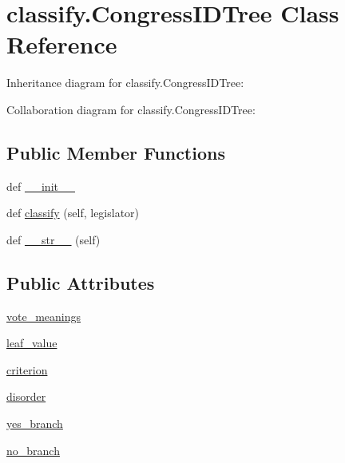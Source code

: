 \hypertarget{classclassify_1_1_congress_i_d_tree}{}\section{classify.\+Congress\+I\+D\+Tree Class Reference}
\label{classclassify_1_1_congress_i_d_tree}


Inheritance diagram for classify.\+Congress\+I\+D\+Tree\+:


Collaboration diagram for classify.\+Congress\+I\+D\+Tree\+:
\subsection*{Public Member Functions}
\begin{DoxyCompactItemize}
\item 
def \hyperlink{classclassify_1_1_congress_i_d_tree_adbb77dc83f9018436eca6f1e2d684088}{\+\_\+\+\_\+init\+\_\+\+\_\+}
\item 
def \hyperlink{classclassify_1_1_congress_i_d_tree_aac690a3d9912b4a4dcf72c4dc2e76811}{classify} (self, legislator)
\item 
def \hyperlink{classclassify_1_1_congress_i_d_tree_a96363d308dbf734d9f04bca08afff45f}{\+\_\+\+\_\+str\+\_\+\+\_\+} (self)
\end{DoxyCompactItemize}
\subsection*{Public Attributes}
\begin{DoxyCompactItemize}
\item 
\hyperlink{classclassify_1_1_congress_i_d_tree_a00eafbcac363d4bfdc21c9923c8e0197}{vote\+\_\+meanings}
\item 
\hyperlink{classclassify_1_1_congress_i_d_tree_a2ef509083aae6cd2234fcfb2f5960647}{leaf\+\_\+value}
\item 
\hyperlink{classclassify_1_1_congress_i_d_tree_afb425013172b67702908b8e6483ccb25}{criterion}
\item 
\hyperlink{classclassify_1_1_congress_i_d_tree_a4257f7022331819d0ba6dc3417851248}{disorder}
\item 
\hyperlink{classclassify_1_1_congress_i_d_tree_af434937bd6183942874cccaee8a7c2aa}{yes\+\_\+branch}
\item 
\hyperlink{classclassify_1_1_congress_i_d_tree_ab5876f6ca83b38302484f1402d94f39b}{no\+\_\+branch}
\end{DoxyCompactItemize}


